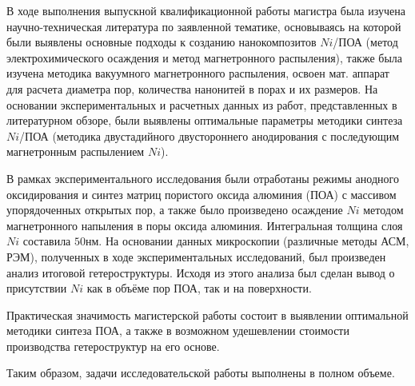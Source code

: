 
В ходе выполнения выпускной квалификационной работы магистра была изучена научно-техническая литература по заявленной тематике, основываясь на которой были выявлены основные подходы к созданию нанокомпозитов $Ni$/ПОА (метод электрохимического осаждения и метод магнетронного распыления), также была изучена методика вакуумного магнетронного распыления, освоен мат. аппарат для расчета диаметра пор, количества нанонитей в порах и их размеров. На основании экспериментальных и расчетных данных из работ, представленных в литературном обзоре, были выявлены оптимальные параметры методики синтеза $Ni$/ПОА (методика двустадийного двустороннего анодирования с последующим магнетронным распылением $Ni$).

В рамках экспериментального исследования были отработаны режимы анодного оксидирования и синтез матриц пористого оксида алюминия (ПОА) с массивом упорядоченных открытых пор, а также было произведено осаждение $Ni$ методом магнетронного напыления в поры оксида алюминия. Интегральная толщина слоя $Ni$ составила $50\text{нм}$. На основании данных микроскопии (различные методы АСМ, РЭМ), полученных в ходе экспериментальных исследований, был произведен анализ итоговой гетероструктуры. Исходя из этого анализа был сделан вывод о присутствии $Ni$ как в объёме пор ПОА, так и на поверхности.

Практическая значимость магистерской работы состоит в выявлении оптимальной методики синтеза ПОА, а также в возможном удешевлении стоимости производства гетероструктур на его основе.

Таким образом, задачи исследовательской работы выполнены в полном объеме.

\clearpage
